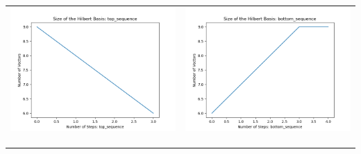 \documentclass[10pt]{article}
\begin{document}
\begin{tabular}{c|c}
\begin{minipage}{.45\textwidth}
\includegraphics[width=\textwidth]{"DATA/5d/5 generators 1 bound D/top_sequence SIZE"}
\end{minipage} &
\begin{minipage}{.45\textwidth}
\includegraphics[width=\textwidth]{"DATA/5d/5 generators 1 bound D bottomup/bottom_sequence SIZE"}
\end{minipage} \\ \\
\hline \\\begin{minipage}{.45\textwidth}

\end{minipage}
\end{tabular}
\end{document}
